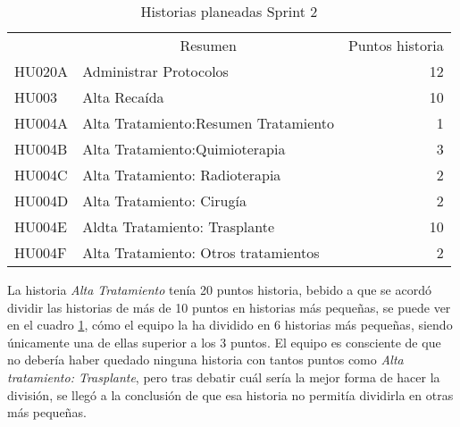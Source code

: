 \begin{table}[!h]
\centering
\caption{Historias planeadas Sprint 2}
\label{historiasSprint2}
\begin{tabular}{llr}
\rowcolor[HTML]{C0C0C0} 
\multicolumn{1}{c}{\cellcolor[HTML]{C0C0C0}Identificador} & \multicolumn{1}{c}{\cellcolor[HTML]{C0C0C0}Resumen} & \multicolumn{1}{c}{\cellcolor[HTML]{C0C0C0}Puntos historia} \\
HU020A                                                     & Administrar Protocolos                            & 12                                                          \\
\rowcolor[HTML]{EFEFEF} 
HU003                                                      & Alta Recaída              						   & 10                                                           \\
HU004A                                                     & Alta Tratamiento:Resumen Tratamiento              & 1                                                          
 \\
\rowcolor[HTML]{EFEFEF} 
HU004B                                                     & Alta Tratamiento:Quimioterapia                    & 3                                                          
\\
HU004C                                                     & Alta Tratamiento: Radioterapia                    & 2                                                          
\\
\rowcolor[HTML]{EFEFEF} 
HU004D                                                     & Alta Tratamiento: Cirugía                         & 2                                                          
\\
HU004E                                                     & Aldta Tratamiento: Trasplante                      & 10                                                          
\\
\rowcolor[HTML]{EFEFEF} 
HU004F                                                     & Alta Tratamiento: Otros tratamientos              & 2                                                          
\\
\end{tabular}
\end{table}


La historia \emph{Alta Tratamiento} tenía 20 puntos historia, bebido a que se acordó dividir las historias de más de 10 puntos en historias más pequeñas, se puede ver en el cuadro \ref{historiasSprint2}, cómo el equipo la ha dividido en 6 historias más pequeñas, siendo únicamente una de ellas superior a los 3 puntos. El equipo es consciente de que no debería haber quedado ninguna historia con tantos puntos como \emph{Alta tratamiento: Trasplante}, pero tras debatir cuál sería la mejor forma de hacer la división, se llegó a la conclusión de que esa historia no permitía dividirla en otras más pequeñas.

